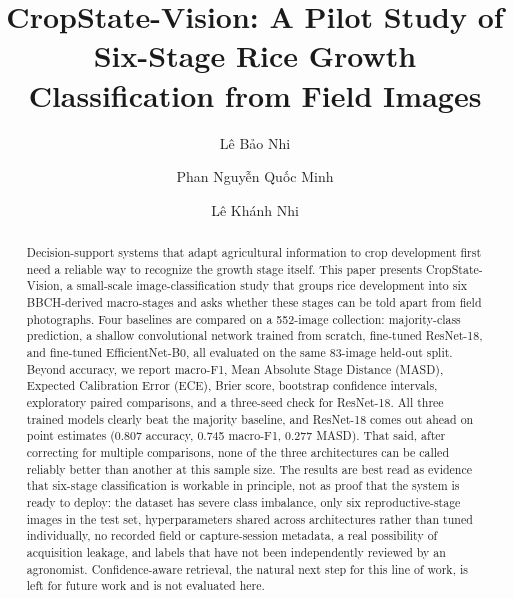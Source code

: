\documentclass{llncs}
\begin{document}
\title{CropState-Vision: A Pilot Study of Six-Stage Rice
Growth Classification from Field Images}

\author{Lê Bảo Nhi \and Phan Nguyễn Quốc Minh \and Lê Khánh Nhi}


\maketitle

\begin{abstract}
Decision-support systems that adapt agricultural information to crop development first need a reliable way to recognize the growth stage itself. This paper presents CropState-Vision, a small-scale image-classification study that groups rice development into six BBCH-derived macro-stages and asks whether these stages can be told apart from field photographs. Four baselines are compared on a 552-image collection: majority-class prediction, a shallow convolutional network trained from scratch, fine-tuned ResNet-18, and fine-tuned EfficientNet-B0, all evaluated on the same 83-image held-out split. Beyond accuracy, we report macro-F1, Mean Absolute Stage Distance (MASD), Expected Calibration Error (ECE), Brier score, bootstrap confidence intervals, exploratory paired comparisons, and a three-seed check for ResNet-18. All three trained models clearly beat the majority baseline, and ResNet-18 comes out ahead on point estimates (0.807 accuracy, 0.745 macro-F1, 0.277 MASD). That said, after correcting for multiple comparisons, none of the three architectures can be called reliably better than another at this sample size. The results are best read as evidence that six-stage classification is workable in principle, not as proof that the system is ready to deploy: the dataset has severe class imbalance, only six reproductive-stage images in the test set, hyperparameters shared across architectures rather than tuned individually, no recorded field or capture-session metadata, a real possibility of acquisition leakage, and labels that have not been independently reviewed by an agronomist. Confidence-aware retrieval, the natural next step for this line of work, is left for future work and is not evaluated here.

\end{abstract}
\end{document}
